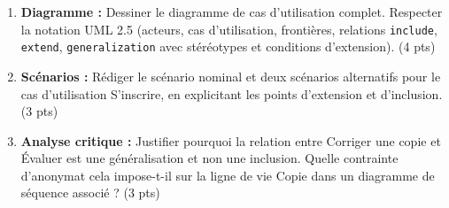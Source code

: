 \documentclass[11pt]{article}
\begin{document}
\begin{exercice}
\begin{enumerate}
    \item \textbf{Diagramme :} Dessiner le diagramme de cas d'utilisation complet. Respecter la notation UML 2.5 (acteurs, cas d'utilisation, frontières, relations \texttt{include}, \texttt{extend}, \texttt{generalization} avec stéréotypes et conditions d'extension). (4 pts)
    \item \textbf{Scénarios :} Rédiger le scénario nominal et deux scénarios alternatifs pour le cas d'utilisation \og{}S'inscrire\fg{}, en explicitant les points d'extension et d'inclusion. (3 pts)
    \item \textbf{Analyse critique :} Justifier pourquoi la relation entre \og{}Corriger une copie\fg{} et \og{}Évaluer\fg{} est une généralisation et non une inclusion. Quelle contrainte d'anonymat cela impose-t-il sur la ligne de vie \og{}Copie\fg{} dans un diagramme de séquence associé ? (3 pts)
\end{enumerate}
\end{exercice}
\end{document}

